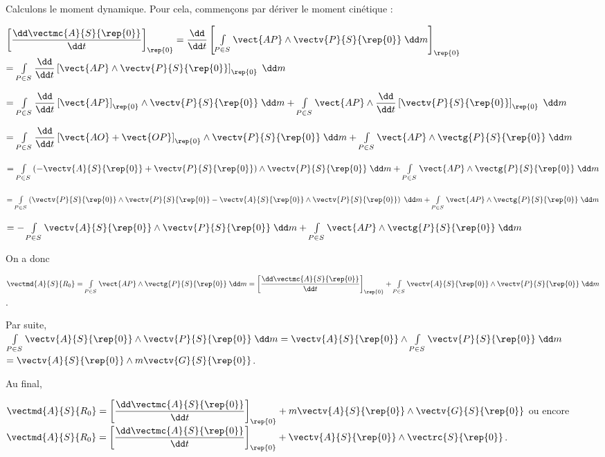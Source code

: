Calculons le moment dynamique. Pour cela, commençons par dériver le moment cinétique : 


$\left[ \dfrac{\dd \vectmc{A}{S}{\rep{0}}}{\dd t} \right]_{\rep{0}}=\dfrac{\dd }{\dd t}\left[\int\limits_{P\in S}\vect{AP}\wedge \vectv{P}{S}{\rep{0}}\; \dd m\right]_{\rep{0}}$
$=\int\limits_{P\in S} \dfrac{\dd }{\dd t}\left[ \vect{AP}\wedge \vectv{P}{S}{\rep{0}} \right]_{\rep{0}}\; \dd m$

$=\int\limits_{P\in S} \dfrac{\dd }{\dd t}\left[ \vect{AP} \right]_{\rep{0}}\wedge \vectv{P}{S}{\rep{0}}\; \dd m 
+ \int\limits_{P\in S}  \vect{AP}\wedge \dfrac{\dd }{\dd t}\left[\vectv{P}{S}{\rep{0}} \right]_{\rep{0}}\; \dd m$

$=\int\limits_{P\in S} \dfrac{\dd }{\dd t}\left[ \vect{AO}+\vect{OP} \right]_{\rep{0}}\wedge \vectv{P}{S}{\rep{0}}\; \dd m 
+ \int\limits_{P\in S}  \vect{AP}\wedge \vectg{P}{S}{\rep{0}} \; \dd m$

$=\int\limits_{P\in S} \left(-\vectv{A}{S}{\rep{0}} + \vectv{P}{S}{\rep{0}}\right)\wedge \vectv{P}{S}{\rep{0}}\; \dd m 
+ \int\limits_{P\in S}  \vect{AP}\wedge \vectg{P}{S}{\rep{0}} \; \dd m$

$=\int\limits_{P\in S} \left(\vectv{P}{S}{\rep{0}} \wedge \vectv{P}{S}{\rep{0}}-\vectv{A}{S}{\rep{0}}\wedge \vectv{P}{S}{\rep{0}}  \right)\; \dd m 
+ \int\limits_{P\in S}  \vect{AP}\wedge \vectg{P}{S}{\rep{0}} \; \dd m$

$=-\int\limits_{P\in S} \vectv{A}{S}{\rep{0}}\wedge \vectv{P}{S}{\rep{0}} \; \dd m 
+ \int\limits_{P\in S}  \vect{AP}\wedge \vectg{P}{S}{\rep{0}} \; \dd m$

On a donc 

$ \vectmd{A}{S}{R_0}= \int\limits_{P\in S}  \vect{AP}\wedge \vectg{P}{S}{\rep{0}} \; \dd m = 
\left[ \dfrac{\dd \vectmc{A}{S}{\rep{0}}}{\dd t} \right]_{\rep{0}} + \int\limits_{P\in S} \vectv{A}{S}{\rep{0}}\wedge \vectv{P}{S}{\rep{0}} \; \dd m $.

Par suite, $\int\limits_{P\in S} \vectv{A}{S}{\rep{0}}\wedge \vectv{P}{S}{\rep{0}} \; \dd m =\vectv{A}{S}{\rep{0}}\wedge \int\limits_{P\in S}  \vectv{P}{S}{\rep{0}} \; \dd m  $
$=\vectv{A}{S}{\rep{0}}\wedge m \vectv{G}{S}{\rep{0}} $.

Au final, 

$ \vectmd{A}{S}{R_0}= \left[ \dfrac{\dd \vectmc{A}{S}{\rep{0}}}{\dd t} \right]_{\rep{0}} +m \vectv{A}{S}{\rep{0}}\wedge  \vectv{G}{S}{\rep{0}} $ ou encore 
$ \vectmd{A}{S}{R_0}= \left[ \dfrac{\dd \vectmc{A}{S}{\rep{0}}}{\dd t} \right]_{\rep{0}} + \vectv{A}{S}{\rep{0}}\wedge  \vectrc{S}{\rep{0}} $.

